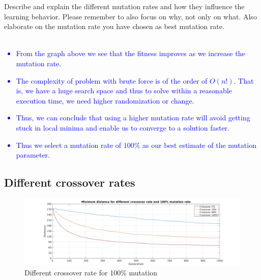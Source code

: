\documentclass[a4paper, 12pt]{article}
\begin{document}
Describe and explain the different mutation rates and how they influence the learning behavior. Please remember to also focus on why, not only on what.
Also elaborate on the mutation rate you have chosen as best mutation rate.
\\ \\
\textcolor{blue}{
	\begin{itemize}
		\item From the graph above we see that the fitness improves as we increase the mutation rate.
		\item The complexity of problem with brute force is of the order of $O(n!)$. That is, we have a huge search space and thus to solve within a reasonable execution time, we need higher randomization or change. 
		\item Thus, we can conclude that using a higher mutation rate will avoid getting stuck in local minima and enable us to converge to a solution faster.
		\item Thus we select a mutation rate of $100\%$ as our best estimate of the mutation parameter. 
	\end{itemize}
	}

\subsection{Different crossover rates}


\begin{figure}[ht!]
  \centering
  \includegraphics[width=1.0\textwidth]{images/crossfig-mine}
    \caption{Different crossover rate for 100\% mutation \label{fig:crossfig}}
\end{figure}
\end{document}
